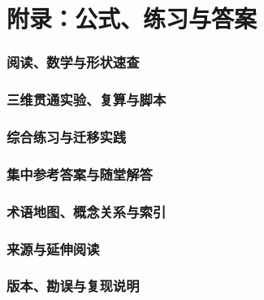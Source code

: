 \documentclass[11pt,a4paper,UTF8]{ctexart}
\numberwithin{equation}{section}
\let\bookboxed\boxed
\renewcommand{\boxed}[1]{#1}
\begin{document}
\part*{附录：公式、练习与答案}
\let\boxed\bookboxed
\section{阅读、数学与形状速查}







\renewcommand{\boxed}[1]{#1}
\clearpage
\section{三维贯通实验、复算与脚本}



\clearpage
\section{综合练习与迁移实践}


\clearpage
\section{集中参考答案与随堂解答}



\clearpage
\section{术语地图、概念关系与索引}




\clearpage
\section{来源与延伸阅读}


\Needspace{.36\textheight}
\section{版本、勘误与复现说明}

\end{document}
